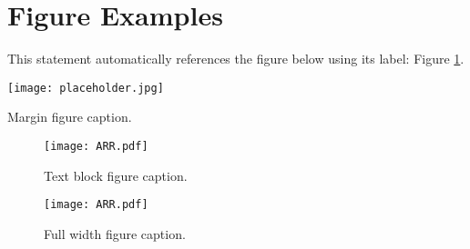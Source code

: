 
\section{Figure Examples}

This statement automatically references the figure below using its label: Figure \ref{fig:example}.


\begin{marginfigure} %
    \texttt{[image: placeholder.jpg]}
    \caption{Margin figure caption.}
\end{marginfigure}


\begin{figure}[H] %
    \texttt{[image: ARR.pdf]}
    \caption{Text block figure caption.}
    \label{fig:example} %
\end{figure}


\begin{figure*} %
    \texttt{[image: ARR.pdf]}
    \caption{Full width figure caption.}
\end{figure*}
